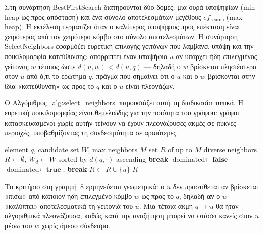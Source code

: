 \documentclass[12pt,a4paper]{article}
\begin{document}
Στη συνάρτηση BestFirstSearch διατηρούνται δύο δομές: μια ουρά υποψηφίων (min-heap ως προς απόσταση) και ένα σύνολο αποτελεσμάτων μεγέθους $ef_{\text{search}}$ (max-heap). Η εκτέλεση τερματίζει όταν ο καλύτερος υποψήφιος προς επέκταση είναι χειρότερος από τον χειρότερο κόμβο στο σύνολο αποτελεσμάτων. Η συνάρτηση SelectNeighbors εφαρμόζει ευρετική επιλογής γειτόνων που λαμβάνει υπόψη και την ποικιλομορφία κατεύθυνσης: απορρίπτει έναν υποψήφιο $u$ αν υπάρχει ήδη επιλεγμένος γείτονας $w$ τέτοιος ώστε $d(u, w) < d(u, q)$ --- δηλαδή ο $w$ βρίσκεται πλησιέστερα στον $u$ από ό,τι το ερώτημα $q$, πράγμα που σημαίνει ότι ο $u$ και ο $w$ βρίσκονται στην ίδια «κατεύθυνση» ως προς το $q$ και ο $u$ είναι πλεονάζων.

Ο Αλγόριθμος~\ref{alg:select_neighbors} παρουσιάζει αυτή τη διαδικασία τυπικά. Η ευρετική ποικιλομορφίας είναι θεμελιώδης για την ποιότητα του γράφου: γράφοι κατασκευασμένοι χωρίς αυτήν τείνουν να έχουν πλεονάζουσες ακμές σε πυκνές περιοχές, υποβαθμίζοντας τη συνδεσιμότητα σε αραιότερες.

\begin{algorithm}[H]
\caption{SelectNeighbors with Diversity Heuristic}
\label{alg:select_neighbors}
\begin{algorithmic}[1]
\Require element $q$, candidate set $W$, max neighbors $M$
\Ensure set $R$ of up to $M$ diverse neighbors
\State $R \leftarrow \emptyset$, $W_d \leftarrow W$ sorted by $d(q,\cdot)$ ascending
        \State \textbf{break}
    \EndIf
    \State $\text{dominated} \leftarrow \textbf{false}$
         
            \State $\text{dominated} \leftarrow \textbf{true}$; \textbf{break}
        \EndIf
    \EndFor
        \State $R \leftarrow R \cup \{u\}$
    \EndIf
\EndFor
\State \Return $R$
\end{algorithmic}
\end{algorithm}

Το κριτήριο στη γραμμή~8 ερμηνεύεται γεωμετρικά: ο $u$ δεν προστίθεται αν βρίσκεται «πίσω» από κάποιον ήδη επιλεγμένο κόμβο $w$ ως προς το $q$, δηλαδή αν ο $w$ «καλύπτει» αποτελεσματικά τη γειτονιά του $u$. Μια τέτοια ακμή $q \to u$ θα ήταν αλγοριθμικά πλεονάζουσα, καθώς κατά την αναζήτηση μπορεί να φτάσει κανείς στον $u$ μέσω του $w$ χωρίς άμεσο σύνδεσμο.
\end{document}
